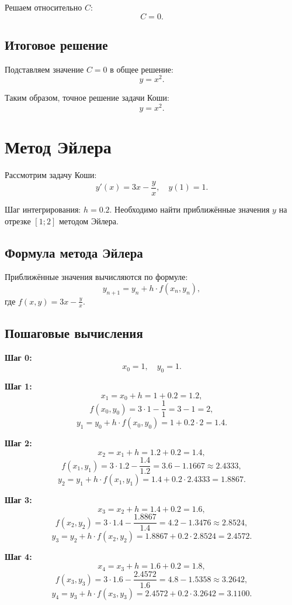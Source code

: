 \documentclass[a4paper,12pt]{article}
\begin{document}
Решаем относительно \( C \):
\[
C = 0.
\]

\subsection*{Итоговое решение}
Подставляем значение \( C = 0 \) в общее решение:
\[
y = x^2.
\]

Таким образом, точное решение задачи Коши:
\[
y = x^2.
\]


\section{Метод Эйлера}



Рассмотрим задачу Коши:
\[
y'(x) = 3x - \frac{y}{x}, \quad y(1) = 1.
\]

Шаг интегрирования: \( h = 0.2 \). Необходимо найти приближённые значения \( y \) на отрезке \([1; 2]\) методом Эйлера.

\subsection*{Формула метода Эйлера}
Приближённые значения вычисляются по формуле:
\[
y_{n+1} = y_n + h \cdot f(x_n, y_n),
\]
где \( f(x, y) = 3x - \frac{y}{x} \).

\subsection*{Пошаговые вычисления}

\textbf{Шаг 0:} 
\[
x_0 = 1, \quad y_0 = 1.
\]

\textbf{Шаг 1:}
\[
x_1 = x_0 + h = 1 + 0.2 = 1.2,
\]
\[
f(x_0, y_0) = 3 \cdot 1 - \frac{1}{1} = 3 - 1 = 2,
\]
\[
y_1 = y_0 + h \cdot f(x_0, y_0) = 1 + 0.2 \cdot 2 = 1.4.
\]

\textbf{Шаг 2:}
\[
x_2 = x_1 + h = 1.2 + 0.2 = 1.4,
\]
\[
f(x_1, y_1) = 3 \cdot 1.2 - \frac{1.4}{1.2} = 3.6 - 1.1667 \approx 2.4333,
\]
\[
y_2 = y_1 + h \cdot f(x_1, y_1) = 1.4 + 0.2 \cdot 2.4333 = 1.8867.
\]

\textbf{Шаг 3:}
\[
x_3 = x_2 + h = 1.4 + 0.2 = 1.6,
\]
\[
f(x_2, y_2) = 3 \cdot 1.4 - \frac{1.8867}{1.4} = 4.2 - 1.3476 \approx 2.8524,
\]
\[
y_3 = y_2 + h \cdot f(x_2, y_2) = 1.8867 + 0.2 \cdot 2.8524 = 2.4572.
\]

\textbf{Шаг 4:}
\[
x_4 = x_3 + h = 1.6 + 0.2 = 1.8,
\]
\[
f(x_3, y_3) = 3 \cdot 1.6 - \frac{2.4572}{1.6} = 4.8 - 1.5358 \approx 3.2642,
\]
\[
y_4 = y_3 + h \cdot f(x_3, y_3) = 2.4572 + 0.2 \cdot 3.2642 = 3.1100.
\]
\end{document}
